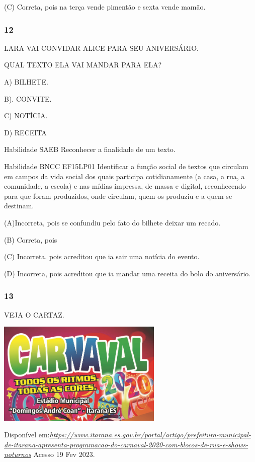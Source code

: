 \begin{escola}
(C) Correta, pois na terça vende pimentão e sexta vende mamão.

\subsubsection{12}\label{section-37}

LARA VAI CONVIDAR ALICE PARA SEU ANIVERSÁRIO.

QUAL TEXTO ELA VAI MANDAR PARA ELA?

A) BILHETE.

B). CONVITE.

C) NOTÍCIA.

D) RECEITA

Habilidade SAEB Reconhecer a finalidade de um texto.

Habilidade BNCC EF15LP01 Identificar a função social de textos que
circulam em campos da vida social dos quais participa cotidianamente (a
casa, a rua, a comunidade, a escola) e nas mídias impressa, de massa e
digital, reconhecendo para que foram produzidos, onde circulam, quem os
produziu e a quem se destinam.

(A)Incorreta, pois se confundiu pelo fato do bilhete deixar um recado.

(B) Correta, pois

(C) Incorreta. pois acreditou que ia sair uma notícia do evento.

(D) Incorreta, pois acreditou que ia mandar uma receita do bolo do
aniversário.\protect\hypertarget{_heading=h.s4vmdpjsaa88}{}{}

\subsubsection{13}\label{section-38}

VEJA O CARTAZ.

\includegraphics[width=3.10650in,height=1.94326in]{media/image204.png}

Disponível
em:\href{https://www.itarana.es.gov.br/portal/artigo/prefeitura-municipal-de-itarana-apresenta-programacao-do-carnaval-2020-com-blocos-de-rua-e-shows-noturnos}{\emph{https://www.itarana.es.gov.br/portal/artigo/prefeitura-municipal-de-itarana-apresenta-programacao-do-carnaval-2020-com-blocos-de-rua-e-shows-noturnos}}
Acesso 19 Fev 2023.


\end{escola}
